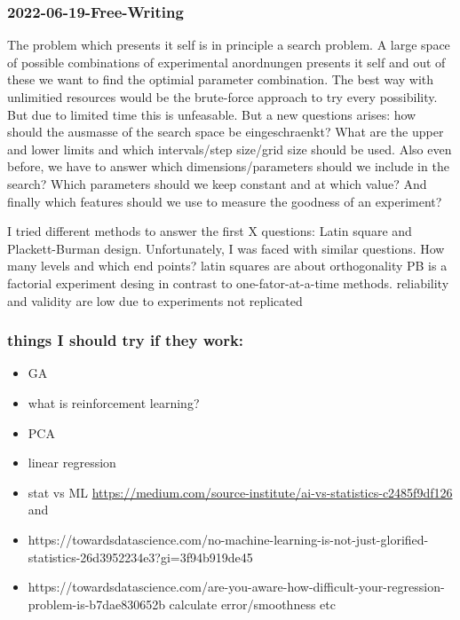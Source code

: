 \subsubsection{2022-06-19-Free-Writing}
The problem which presents it self is in principle a search problem.
A large space of possible combinations of experimental anordnungen presents it self
and out of these we want to find the optimial parameter combination. 
The best way with unlimitied resources would be the brute-force approach to try every possibility. 
But due to limited time this is unfeasable. 
But a new questions arises: how should the ausmasse of the search space be eingeschraenkt? 
What are the upper and lower limits and which intervals/step size/grid size should be used. 
Also even before, we have to answer which dimensions/parameters should we include in the search? 
Which parameters should we keep constant and at which value? 
And finally which features should we use to measure the goodness of an experiment? 

I tried different methods to answer the first X questions: Latin square and Plackett-Burman design.
Unfortunately, I was faced with similar questions. How many levels and which end points? 
latin squares are about orthogonality 
PB is a factorial experiment desing in contrast to one-fator-at-a-time methods.
reliability and validity are low due to experiments not replicated 

\subsubsection{things I should try if they work:}
\begin{itemize}
    \item GA 
    \item what is reinforcement learning? 
    \item PCA
    \item linear regression
    \item stat vs ML \url{https://medium.com/source-institute/ai-vs-statistics-c2485f9df126} and 
    \item https://towardsdatascience.com/no-machine-learning-is-not-just-glorified-statistics-26d3952234e3?gi=3f94b919de45
    \item https://towardsdatascience.com/are-you-aware-how-difficult-your-regression-problem-is-b7dae830652b calculate error/smoothness etc
\end{itemize}

